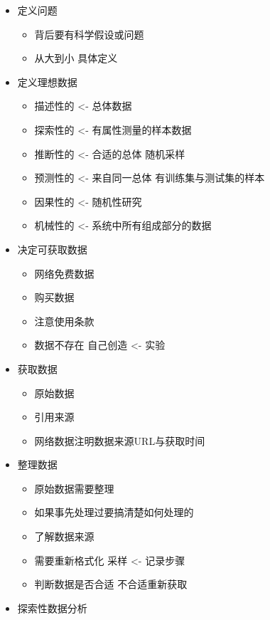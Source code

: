 \documentclass[]{book}
\providecommand{\tightlist}{%
  \setlength{\itemsep}{0pt}\setlength{\parskip}{0pt}}
\begin{document}
\begin{itemize}
\item
  定义问题

  \begin{itemize}
  \tightlist
  \item
    背后要有科学假设或问题
  \item
    从大到小 具体定义
  \end{itemize}
\item
  定义理想数据

  \begin{itemize}
  \tightlist
  \item
    描述性的 \textless{}- 总体数据
  \item
    探索性的 \textless{}- 有属性测量的样本数据
  \item
    推断性的 \textless{}- 合适的总体 随机采样
  \item
    预测性的 \textless{}- 来自同一总体 有训练集与测试集的样本
  \item
    因果性的 \textless{}- 随机性研究
  \item
    机械性的 \textless{}- 系统中所有组成部分的数据
  \end{itemize}
\item
  决定可获取数据

  \begin{itemize}
  \tightlist
  \item
    网络免费数据
  \item
    购买数据
  \item
    注意使用条款
  \item
    数据不存在 自己创造 \textless{}- 实验
  \end{itemize}
\item
  获取数据

  \begin{itemize}
  \tightlist
  \item
    原始数据
  \item
    引用来源
  \item
    网络数据注明数据来源URL与获取时间
  \end{itemize}
\item
  整理数据

  \begin{itemize}
  \tightlist
  \item
    原始数据需要整理
  \item
    如果事先处理过要搞清楚如何处理的
  \item
    了解数据来源
  \item
    需要重新格式化 采样 \textless{}- 记录步骤
  \item
    判断数据是否合适 不合适重新获取
  \end{itemize}
\item
  探索性数据分析


\end{itemize}
\end{document}
